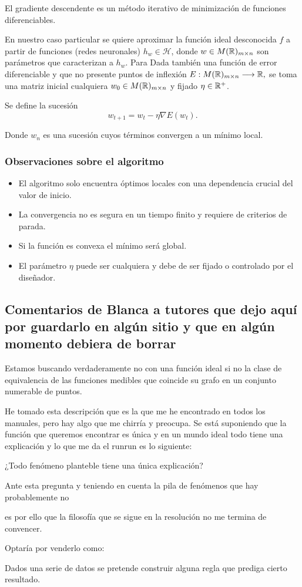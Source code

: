 El gradiente descendente es un método iterativo de minimización de funciones diferenciables. 

En nuestro caso particular se quiere aproximar la función ideal desconocida $f$ a partir de funciones (redes neuronales) $h_w \in \mathcal{H}$, donde $w \in M(\mathbb{R})_{m \times n}$ son parámetros que caracterizan a $h_w$.
Para  
Dada también una función de error diferenciable y que no presente puntos de inflexión
$E: M(\mathbb{R})_{m \times n} \longrightarrow \mathbb{R},$
se toma una matriz inicial  cualquiera $w_0 \in M(\mathbb{R})_{m \times n}$ y 
fijado $\eta \in \mathbb{R}^+$. 

Se define la sucesión 
\begin{equation}
    w_{t+1}  = w_t - \eta \nabla E(w_t).
\end{equation}  

Donde $w_n$ es una sucesión cuyos términos convergen a un mínimo local.
\subsubsection*{Observaciones sobre el algoritmo }

\begin{itemize}
    \item El algoritmo solo encuentra óptimos locales con una dependencia crucial del valor de inicio. 
    \item La convergencia no es segura en un tiempo finito y requiere de criterios de parada. 
    \item Si la función es convexa el mínimo será global.
    \item El parámetro $\eta$ puede ser cualquiera y debe de ser fijado o controlado por el diseñador.  
\end{itemize}


\subsection{Comentarios de Blanca a tutores que dejo aquí por guardarlo en algún sitio y que en algún momento debiera de borrar} 


Estamos buscando verdaderamente no con una función ideal si no 
la clase de equivalencia de las funciones medibles que coincide su grafo en un conjunto numerable de puntos. 


He tomado esta descripción que es la que me he encontrado en todos los manuales, pero hay algo que me chirría y preocupa. Se está suponiendo que la función que queremos encontrar es única y en un mundo ideal todo tiene una explicación y lo que me da el runrun es lo siguiente: 

¿Todo fenómeno planteble tiene una única explicación? 

Ante esta pregunta y teniendo en cuenta la pila de fenómenos que hay probablemente no  

es por ello que la filosofía que se sigue en la resolución no me termina de convencer. 

Optaría por venderlo como: 

Dados una serie de datos se pretende construir alguna regla que prediga cierto resultado. 



